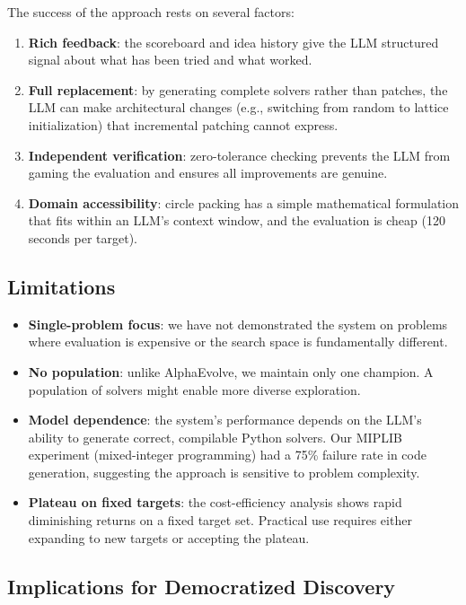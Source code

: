 \documentclass[11pt]{article}
\begin{document}
The success of the approach rests on several factors:

\begin{enumerate}
  \item \textbf{Rich feedback}: the scoreboard and idea history give the LLM structured
        signal about what has been tried and what worked.
  \item \textbf{Full replacement}: by generating complete solvers rather than patches, the
        LLM can make architectural changes (e.g., switching from random to lattice
        initialization) that incremental patching cannot express.
  \item \textbf{Independent verification}: zero-tolerance checking prevents the LLM from
        gaming the evaluation and ensures all improvements are genuine.
  \item \textbf{Domain accessibility}: circle packing has a simple mathematical formulation
        that fits within an LLM's context window, and the evaluation is cheap (120 seconds
        per target).
\end{enumerate}

\subsection{Limitations}

\begin{itemize}
  \item \textbf{Single-problem focus}: we have not demonstrated the system on problems where
        evaluation is expensive or the search space is fundamentally different.
  \item \textbf{No population}: unlike AlphaEvolve, we maintain only one champion. A population
        of solvers might enable more diverse exploration.
  \item \textbf{Model dependence}: the system's performance depends on the LLM's ability to
        generate correct, compilable Python solvers. Our MIPLIB experiment (mixed-integer
        programming) had a 75\% failure rate in code generation, suggesting the approach is
        sensitive to problem complexity.
  \item \textbf{Plateau on fixed targets}: the cost-efficiency analysis shows rapid diminishing
        returns on a fixed target set. Practical use requires either expanding to new targets
        or accepting the plateau.
\end{itemize}

\subsection{Implications for Democratized Discovery}
\end{document}
